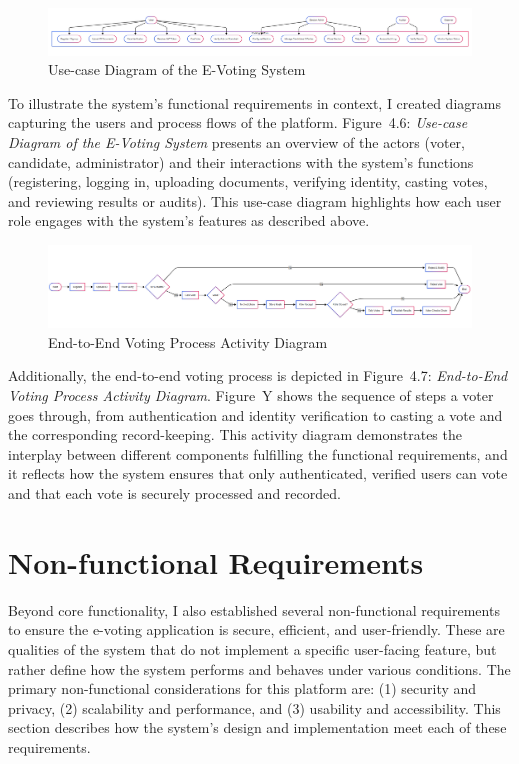 \documentclass[a4paper,10pt]{report}
\begin{document}
\begin{figure}[htbp]
  \centering
  \includegraphics[width=1.0\textwidth]{useCase.PNG}
  \caption{Use-case Diagram of the E-Voting System}
  \label{fig:full}
\end{figure}

To illustrate the system’s functional requirements in context, I created diagrams capturing the users and process flows of the platform. Figure~4.6: \emph{Use-case Diagram of the E-Voting System} presents an overview of the actors (voter, candidate, administrator) and their interactions with the system’s functions (registering, logging in, uploading documents, verifying identity, casting votes, and reviewing results or audits). This use-case diagram highlights how each user role engages with the system’s features as described above. 

\begin{figure}[htbp]
  \centering
  \includegraphics[width=1.0\textwidth]{goodVotingProcess.PNG}
  \caption{End-to-End Voting Process Activity Diagram}
  \label{fig:full}
\end{figure}

Additionally, the end-to-end voting process is depicted in Figure~4.7: \emph{End-to-End Voting Process Activity Diagram}. Figure~Y shows the sequence of steps a voter goes through, from authentication and identity verification to casting a vote and the corresponding record-keeping. This activity diagram demonstrates the interplay between different components fulfilling the functional requirements, and it reflects how the system ensures that only authenticated, verified users can vote and that each vote is securely processed and recorded.

\section{Non-functional Requirements}
Beyond core functionality, I also established several non-functional requirements to ensure the e-voting application is secure, efficient, and user-friendly. These are qualities of the system that do not implement a specific user-facing feature, but rather define how the system performs and behaves under various conditions. The primary non-functional considerations for this platform are: (1) security and privacy, (2) scalability and performance, and (3) usability and accessibility. This section describes how the system’s design and implementation meet each of these requirements.
\end{document}
